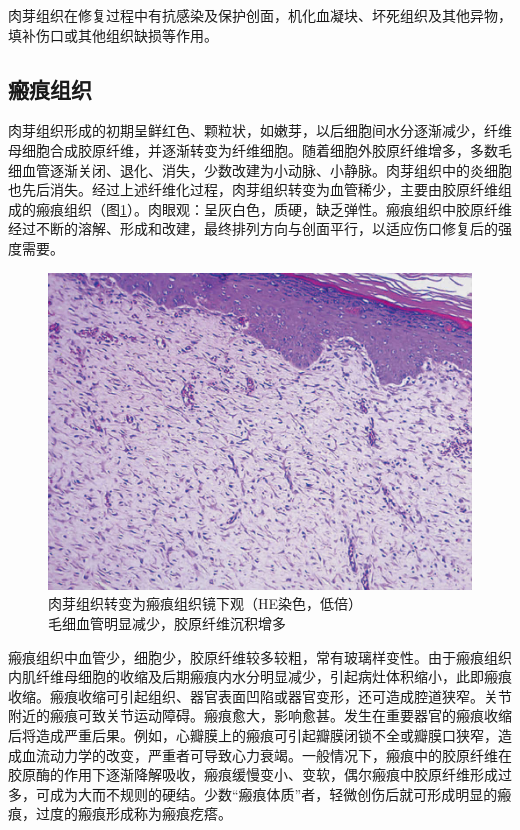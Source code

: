 肉芽组织在修复过程中有抗感染及保护创面，机化血凝块、坏死组织及其他异物，填补伤口或其他组织缺损等作用。

\subsection{瘢痕组织}

肉芽组织形成的初期呈鲜红色、颗粒状，如嫩芽，以后细胞间水分逐渐减少，纤维母细胞合成胶原纤维，并逐渐转变为纤维细胞。随着细胞外胶原纤维增多，多数毛细血管逐渐关闭、退化、消失，少数改建为小动脉、小静脉。肉芽组织中的炎细胞也先后消失。经过上述纤维化过程，肉芽组织转变为血管稀少，主要由胶原纤维组成的瘢痕组织（图\ref{fig2-5}）。肉眼观：呈灰白色，质硬，缺乏弹性。瘢痕组织中胶原纤维经过不断的溶解、形成和改建，最终排列方向与创面平行，以适应伤口修复后的强度需要。

\begin{figure}[!htbp]
	\centering
	\includegraphics{./images/Image00028.jpg}
	\caption{肉芽组织转变为瘢痕组织镜下观（HE染色，低倍） \\ {\small 毛细血管明显减少，胶原纤维沉积增多}}
	\label{fig2-5}
\end{figure}

瘢痕组织中血管少，细胞少，胶原纤维较多较粗，常有玻璃样变性。由于瘢痕组织内肌纤维母细胞的收缩及后期瘢痕内水分明显减少，引起病灶体积缩小，此即瘢痕收缩。瘢痕收缩可引起组织、器官表面凹陷或器官变形，还可造成腔道狭窄。关节附近的瘢痕可致关节运动障碍。瘢痕愈大，影响愈甚。发生在重要器官的瘢痕收缩后将造成严重后果。例如，心瓣膜上的瘢痕可引起瓣膜闭锁不全或瓣膜口狭窄，造成血流动力学的改变，严重者可导致心力衰竭。一般情况下，瘢痕中的胶原纤维在胶原酶的作用下逐渐降解吸收，瘢痕缓慢变小、变软，偶尔瘢痕中胶原纤维形成过多，可成为大而不规则的硬结。少数“瘢痕体质”者，轻微创伤后就可形成明显的瘢痕，过度的瘢痕形成称为瘢痕疙瘩。

